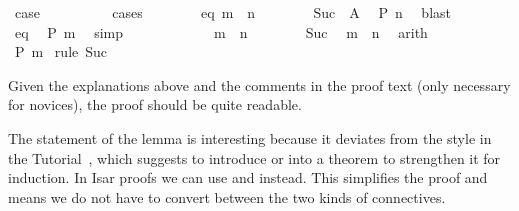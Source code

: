 \begin{isabellebody}
\ {\isacharquery}case\ \ \ \ %
\isanewline
\ \ \ \ \isamarkupfalse%
\ cases\isanewline
\ \ \ \ \ \ \isamarkupfalse%
\ eq{\isacharcolon}\ {\isachardoublequote}m\ {\isacharequal}\ n{\isachardoublequote}\isanewline
\ \ \ \ \ \ \isamarkupfalse%
\ Suc\ \ A\ \isamarkupfalse%
\ {\isachardoublequote}P\ n{\isachardoublequote}\ \isamarkupfalse%
\ blast\isanewline
\ \ \ \ \ \ \isamarkupfalse%
\ eq\ \isamarkupfalse%
\ {\isachardoublequote}P\ m{\isachardoublequote}\ \isamarkupfalse%
\ simp\isanewline
\ \ \ \ \isamarkupfalse%
\isanewline
\ \ \ \ \ \ \isamarkupfalse%
\ {\isachardoublequote}m\ {\isasymnoteq}\ n{\isachardoublequote}\isanewline
\ \ \ \ \ \ \isamarkupfalse%
\ Suc\ \isamarkupfalse%
\ {\isachardoublequote}m\ {\isacharless}\ n{\isachardoublequote}\ \isamarkupfalse%
\ arith\isanewline
\ \ \ \ \ \ \isamarkupfalse%
\ {\isachardoublequote}P\ m{\isachardoublequote}\ \isamarkupfalse%
rule\ Suc{\isacharparenright}\isanewline
\ \ \ \ \isamarkupfalse%
\isanewline
\ \ \isamarkupfalse%
\isanewline
\isamarkupfalse%
\isamarkupfalse%
%
\begin{isamarkuptext}%
\noindent Given the explanations above and the comments in the
proof text (only necessary for novices), the proof should be quite
readable.

The statement of the lemma is interesting because it deviates from the style in
the Tutorial~\cite{LNCS2283}, which suggests to introduce \isa{{\isasymforall}} or
\isa{{\isasymlongrightarrow}} into a theorem to strengthen it for induction. In Isar
proofs we can use \isa{{\isasymAnd}} and \isa{{\isasymLongrightarrow}} instead. This simplifies the
proof and means we do not have to convert between the two kinds of
connectives.


\end{isamarkuptext}
\end{isabellebody}
